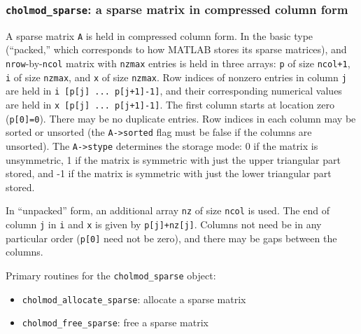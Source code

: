 \documentclass[11pt]{article}
\begin{document}
\newpage \subsubsection{{\tt cholmod\_sparse}: a sparse matrix in compressed column form}
    A sparse matrix {\tt A} is held in compressed column form.  In the basic
    type (``packed,'' which corresponds to how MATLAB stores its sparse
    matrices), and {\tt nrow}-by-{\tt ncol} matrix with {\tt nzmax} entries
    is held in three arrays: {\tt p} of size {\tt ncol+1},
    {\tt i} of size {\tt nzmax}, and {\tt x} of size {\tt nzmax}.
    Row indices of nonzero entries in column {\tt j} are held in
    {\tt i [p[j] ... p[j+1]-1]}, and their corresponding numerical values
    are held in {\tt x [p[j] ... p[j+1]-1]}.  The first column starts at
    location zero ({\tt p[0]=0}).
    There may be no duplicate entries.  Row indices in each column may
    be sorted or unsorted (the {\tt A->sorted} flag must be false if
    the columns are unsorted).  The {\tt A->stype} determines the 
    storage mode: 0 if the matrix is unsymmetric, 1 if the matrix is
    symmetric with just the upper triangular part stored, and -1 if
    the matrix is symmetric with just the lower triangular part stored.

    In ``unpacked'' form, an additional array {\tt nz} of size {\tt ncol}
    is used.  The end of column {\tt j} in {\tt i} and {\tt x}
    is given by {\tt p[j]+nz[j]}.  Columns not need be in any particular
    order ({\tt p[0]} need not be zero), and there may be gaps between
    the columns.

\vspace{0.1in}
\noindent Primary routines for the {\tt cholmod\_sparse} object:
    \begin{itemize}
    \item {\tt cholmod\_allocate\_sparse}: allocate a sparse matrix
    \item {\tt cholmod\_free\_sparse}: free a sparse matrix
    \end{itemize}
\end{document}
